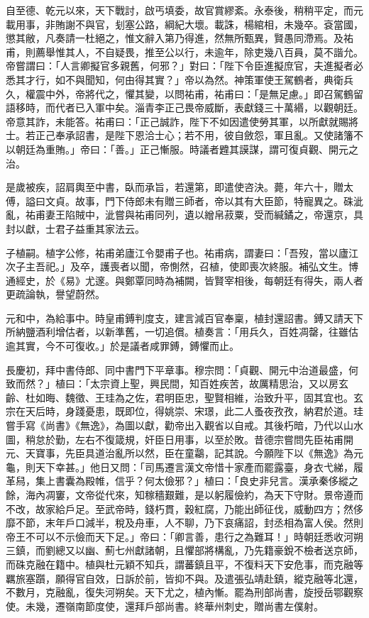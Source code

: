 \begin{pinyinscope}
 自至德、乾元以來，天下戰討，啟丐填委，故官賞繆紊。永泰後，稍稍平定，而元載用事，非賄謝不與官，刬塞公路，綱紀大壞。載誅，楊綰相，未幾卒。袞當國，懲其敝，凡奏請一杜絕之，惟文辭入第乃得進，然無所甄異，賢愚同滯焉。及祐甫，則薦舉惟其人，不自疑畏，推至公以行，未逾年，除吏幾八百員，莫不諧允。帝嘗謂曰：「人言卿擬官多親舊，何邪？」對曰：「陛下令臣進擬庶官，夫進擬者必悉其才行，如不與聞知，何由得其實？」帝以為然。神策軍使王駕鶴者，典衛兵久，權震中外，帝將代之，懼其變，以問祐甫，祐甫曰：「是無足慮。」即召駕鶴留語移時，而代者已入軍中矣。淄青李正己畏帝威斷，表獻錢三十萬緡，以觀朝廷。帝意其詐，未能答。祐甫曰：「正己誠詐，陛下不如因遣使勞其軍，以所獻就賜將士。若正己奉承詔書，是陛下恩洽士心；若不用，彼自斂怨，軍且亂。又使諸籓不以朝廷為重賄。」帝曰：「善。」正己慚服。時議者韙其謨謀，謂可復貞觀、開元之治。



 是歲被疾，詔肩輿至中書，臥而承旨，若還第，即遣使咨決。薨，年六十，贈太傅，謚曰文貞。故事，門下侍郎未有贈三師者，帝以其有大臣節，特寵異之。硃泚亂，祐甫妻王陷賊中，泚嘗與祐甫同列，遺以繒帛菽粟，受而緘鐍之，帝還京，具封以獻，士君子益重其家法云。



 子植嗣。植字公修，祐甫弟廬江令嬰甫子也。祐甫病，謂妻曰：「吾歿，當以廬江次子主吾祀。」及卒，護喪者以聞，帝惻然，召植，使即喪次終服。補弘文生。博通經史，於《易》尤邃。與鄭覃同時為補闕，皆賢宰相後，每朝廷有得失，兩人者更疏論執，譽望蔚然。



 元和中，為給事中。時皇甫鎛判度支，建言減百官奉稟，植封還詔書。鎛又請天下所納鹽酒利增估者，以新準舊，一切追償。植奏言：「用兵久，百姓凋罄，往雖估逾其實，今不可復收。」於是議者咸罪鎛，鎛懼而止。



 長慶初，拜中書侍郎、同中書門下平章事。穆宗問：「貞觀、開元中治道最盛，何致而然？」植曰：「太宗資上聖，興民間，知百姓疾苦，故厲精思治，又以房玄齡、杜如晦、魏徵、王珪為之佐，君明臣忠，聖賢相維，治致升平，固其宜也。玄宗在天后時，身踐憂患，既即位，得姚崇、宋璟，此二人蚤夜孜孜，納君於道。珪嘗手寫《尚書》《無逸》，為圖以獻，勸帝出入觀省以自戒。其後朽暗，乃代以山水圖，稍怠於勤，左右不復箴規，奸臣日用事，以至於敗。昔德宗嘗問先臣祐甫開元、天寶事，先臣具道治亂所以然，臣在童鸘，記其說。今願陛下以《無逸》為元龜，則天下幸甚。」他日又問：「司馬遷言漢文帝惜十家產而罷露臺，身衣弋綈，履革舄，集上書囊為殿帷，信乎？何太儉邪？」植曰：「良史非兒言。漢承秦侈縱之餘，海內凋窶，文帝從代來，知稼穡艱難，是以躬履儉約，為天下守財。景帝遵而不改，故家給戶足。至武帝時，錢朽貫，穀紅腐，乃能出師征伐，威動四方；然侈靡不節，末年戶口減半，稅及舟車，人不聊，乃下哀痛詔，封丞相為富人侯。然則帝王不可以不示儉而天下足。」帝曰：「卿言善，患行之為難耳！」時朝廷悉收河朔三鎮，而劉總又以幽、薊七州獻諸朝，且懼部將構亂，乃先籍豪銳不檢者送京師，而硃克融在籍中。植與杜元穎不知兵，謂蕃鎮且平，不復料天下安危事，而克融等羈旅塞躓，願得官自效，日訴於前，皆抑不與。及遣張弘靖赴鎮，縱克融等北還，不數月，克融亂，復失河朔矣。天下尤之，植內慚。罷為刑部尚書，旋授岳鄂觀察使。未幾，遷嶺南節度使，還拜戶部尚書。終華州刺史，贈尚書左僕射。




\end{pinyinscope}
